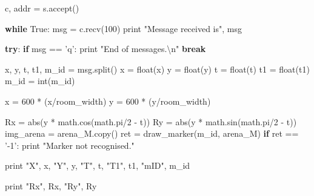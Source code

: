 \documentclass[]{article}
\newenvironment{Shaded}{}{}
\newcommand{\DecValTok}[1]{\textcolor[rgb]{0.25,0.63,0.44}{{#1}}}
\newcommand{\CharTok}[1]{\textcolor[rgb]{0.25,0.44,0.63}{{#1}}}
\newcommand{\StringTok}[1]{\textcolor[rgb]{0.25,0.44,0.63}{{#1}}}
\newcommand{\VariableTok}[1]{\textcolor[rgb]{0.10,0.09,0.49}{{#1}}}
\newcommand{\ControlFlowTok}[1]{\textcolor[rgb]{0.00,0.44,0.13}{\textbf{{#1}}}}
\newcommand{\OperatorTok}[1]{\textcolor[rgb]{0.40,0.40,0.40}{{#1}}}
\newcommand{\BuiltInTok}[1]{{#1}}
\newcommand{\NormalTok}[1]{{#1}}
\begin{document}
\begin{Shaded}
\begin{Highlighting}[]
    \NormalTok{c, addr }\OperatorTok{=} \NormalTok{s.accept()}

    \ControlFlowTok{while} \VariableTok{True}\NormalTok{:}
        \NormalTok{msg }\OperatorTok{=} \NormalTok{c.recv(}\DecValTok{100}\NormalTok{)}
        \BuiltInTok{print} \StringTok{"Message received is"}\NormalTok{, msg}
        
        \ControlFlowTok{try}\NormalTok{:}
            \ControlFlowTok{if} \NormalTok{msg }\OperatorTok{==} \StringTok{'q'}\NormalTok{:}
                \BuiltInTok{print} \StringTok{"End of messages.}\CharTok{\textbackslash{}n}\StringTok{"}
                \ControlFlowTok{break}

            \NormalTok{x, y, t, t1, m_id }\OperatorTok{=} \NormalTok{msg.split()}
            \NormalTok{x }\OperatorTok{=} \BuiltInTok{float}\NormalTok{(x)}
            \NormalTok{y }\OperatorTok{=} \BuiltInTok{float}\NormalTok{(y)}
            \NormalTok{t }\OperatorTok{=} \BuiltInTok{float}\NormalTok{(t)}
            \NormalTok{t1 }\OperatorTok{=} \BuiltInTok{float}\NormalTok{(t1)}
            \NormalTok{m_id }\OperatorTok{=} \BuiltInTok{int}\NormalTok{(m_id)}

            \NormalTok{x }\OperatorTok{=} \DecValTok{600} \OperatorTok{*} \NormalTok{(x}\OperatorTok{/}\NormalTok{room_width)}
            \NormalTok{y }\OperatorTok{=} \DecValTok{600} \OperatorTok{*} \NormalTok{(y}\OperatorTok{/}\NormalTok{room_width)}
            
            \NormalTok{Rx }\OperatorTok{=} \BuiltInTok{abs}\NormalTok{(y }\OperatorTok{*} \NormalTok{math.cos(math.pi}\OperatorTok{/}\DecValTok{2} \OperatorTok{-} \NormalTok{t))}
            \NormalTok{Ry }\OperatorTok{=} \BuiltInTok{abs}\NormalTok{(y }\OperatorTok{*} \NormalTok{math.sin(math.pi}\OperatorTok{/}\DecValTok{2} \OperatorTok{-} \NormalTok{t))}
            \NormalTok{img_arena }\OperatorTok{=} \NormalTok{arena_M.copy()}
            \NormalTok{ret }\OperatorTok{=} \NormalTok{draw_marker(m_id, arena_M)}
            \ControlFlowTok{if} \NormalTok{ret }\OperatorTok{==} \StringTok{'-1'}\NormalTok{:}
                \BuiltInTok{print} \StringTok{"Marker not recognised."}
                
            \BuiltInTok{print} \StringTok{"X"}\NormalTok{, x, }\StringTok{"Y"}\NormalTok{, y, }\StringTok{"T"}\NormalTok{, t, }\StringTok{"T1"}\NormalTok{, t1, }\StringTok{"mID"}\NormalTok{, m_id}

            \BuiltInTok{print} \StringTok{"Rx"}\NormalTok{, Rx, }\StringTok{"Ry"}\NormalTok{, Ry}


\end{Highlighting}
\end{Shaded}
\end{document}
